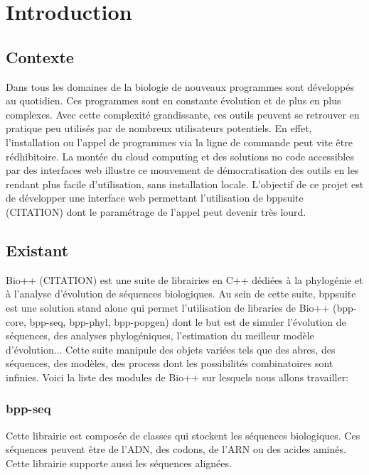 
\section{Introduction}	%

\subsection{Contexte}
	
	
	Dans tous les domaines de la biologie de nouveaux programmes sont développés au quotidien. Ces programmes sont en constante évolution et de plus en plus complexes. Avec cette complexité grandissante, ces outils peuvent se retrouver en pratique peu utilisés par de nombreux utilisateurs potentiels. En effet, l'installation ou l'appel de programmes via la ligne de commande peut vite être rédhibitoire.
	La montée du cloud computing et des solutions no code accessibles par des interfaces web illustre ce mouvement de démocratisation des outils en les rendant plus facile d'utilisation, sans installation locale.
	L'objectif de ce projet est de développer une interface web permettant l'utilisation de bppsuite (CITATION) dont le paramétrage de l'appel peut devenir très lourd.
	
	
\subsection{Existant}
	Bio++ (CITATION) est une suite de librairies en C++ dédiées à la phylogénie et à l'analyse d'évolution de séquences biologiques. Au sein de cette suite, bppsuite est une solution stand alone qui permet l'utilisation de libraries de Bio++ (bpp-core, bpp-seq, bpp-phyl, bpp-popgen) dont le but est de simuler l'évolution de séquences, des analyses phylogéniques, l'estimation du meilleur modèle d'évolution... Cette suite manipule des objets variées tels que des abres, des séquences, des modèles, des process dont les possibilités combinatoires sont infinies. Voici la liste des modules de Bio++ sur lesquels nous allons travailler:
	
	\subsubsection*{bpp-seq}
	Cette librairie est composée de classes qui stockent les séquences biologiques. Ces séquences peuvent être de l'ADN, des codons, de l'ARN ou des acides aminés. Cette librairie supporte aussi les séquences alignées.
	
